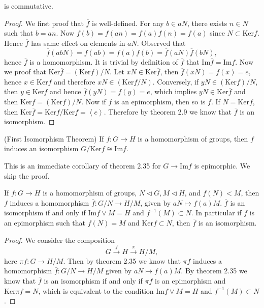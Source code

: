 is commutative.
\begin{proof}
We first proof that $\overline{f}$ is well-defined. For any $b\in aN$, there exists $n\in N$ such that $b=an$. Now $f(b)=f(an)=f(a)f(n)=f(a)$ since $N\subset\mathrm{Ker}f$. Hence $\overline{f}$ has same effect on elements in $aN$. Observed that 
$$
\overline{f}\left( abN \right) =f\left( ab \right) =f\left( a \right) f\left( b \right) =\overline{f}\left( aN \right) \overline{f}\left( bN \right) ,
$$
hence $\overline{f}$ is a homomorphism. It is trivial by definition of $\overline{f}$ that $\mathrm{Im}\overline{f}=\mathrm{Im}f$. Now we proof that $\mathrm{Ker}\overline{f}=(\mathrm{Ker}f)/N$. Let $xN\in\mathrm{Ker}\overline{f}$, then $\overline{f}(xN)=f(x)=e$, hence $x\in\mathrm{Ker}f$ and therefore $xN\in(\mathrm{Ker}f/N)$. Conversely, if $yN\in(\mathrm{Ker}f)/N$, then $y\in\mathrm{Ker}f$ and hence $\overline{f}(yN)=f(y)=e$, which implies $yN\in\mathrm{Ker}\overline{f}$ and then $\mathrm{Ker}\overline{f}=(\mathrm{Ker}f)/N$. Now if $f$ is an epimorphism, then so is $\overline{f}$. If $N=\mathrm{Ker}f$, then $\mathrm{Ker}\overline{f}=\mathrm{Ker}f/\mathrm{Ker}f=\left<e\right>$. Therefore by theorem 2.9 we know that $\overline{f}$ is an isomorphism.
\end{proof}
\begin{corollary}(First Isomorphism Theorem)
If $f:G\to H$ is a homomorphism of groups, then $f$ induces an isomorphism $G/\mathrm{Ker}f\cong\mathrm{Im}f$.
\end{corollary}
This is an immediate corollary of theorem 2.35 for $G\to\mathrm{Im}f$ is epimorphic. We skip the proof.
\begin{corollary}
If $f:G\to H$ is a homomorphism of groups, $N\lhd G,M\lhd H$, and $f(N)<M$, then $f$ induces a homomorphism $\overline{f}:G/N\to H/M$, given by $aN\mapsto f(a)M$. $\overline{f}$ is an isomorphism if and only if $\mathrm{Im}f\vee M=H$ and $f^{-1}(M)\subset N$. In particular if $f$ is an epimorphism such that $f(N)=M$ and $\mathrm{Ker}f\subset N$, then $\overline{f}$ is an isomorphism.
\end{corollary}
\begin{proof}
We consider the composition 
$$
G\overset{f}{\longrightarrow}H\overset{\pi}{\longrightarrow}H/M,
$$
here $\pi f:G\to H/M$. Then by theorem 2.35 we know that $\pi f$ induces a homomorphism $\overline{f}:G/N\to H/M$ given by $aN\mapsto f(a)M$. By theorem 2.35 we know that $\overline{f}$ is an isomorphism if and only if $\pi f$ is an epimorphism and $\mathrm{Ker}\pi f=N$, which is equivalent to the condition $\mathrm{Im}f\vee M=H$ and $f^{-1}(M)\subset N$.
\end{proof}
